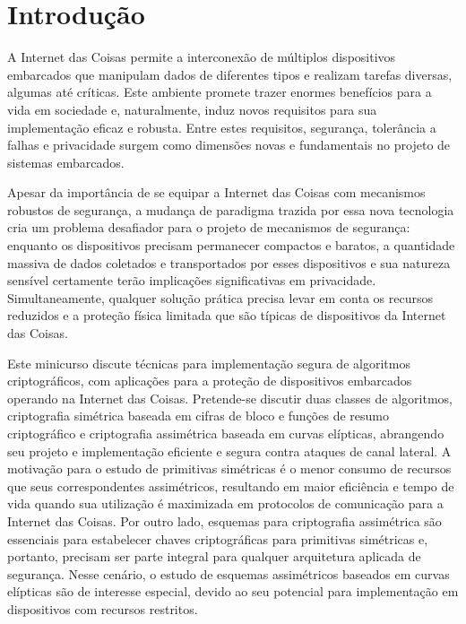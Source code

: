 \section{Introdução}

A Internet das Coisas permite a interconexão de múltiplos dispositivos embarcados que manipulam dados de diferentes tipos e realizam tarefas diversas, algumas até críticas. Este ambiente promete trazer enormes benefícios para a vida em sociedade e, naturalmente, induz novos requisitos para sua implementação eficaz e robusta. Entre estes requisitos, segurança, tolerância a falhas e privacidade surgem como dimensões novas e fundamentais no projeto de sistemas embarcados.

Apesar da importância de se equipar a Internet das Coisas com mecanismos robustos de segurança, a mudança de paradigma trazida por essa nova tecnologia cria um problema desafiador para o projeto de mecanismos de segurança: enquanto os dispositivos precisam permanecer compactos e baratos, a quantidade massiva de dados coletados e transportados por esses dispositivos e sua natureza sensível certamente terão implicações significativas em privacidade. Simultaneamente, qualquer solução prática precisa levar em conta os recursos reduzidos e a proteção física limitada que são típicas de dispositivos da Internet das Coisas.

Este minicurso discute técnicas para implementação segura de algoritmos criptográficos, com aplicações para a proteção de dispositivos embarcados operando na Internet das Coisas. Pretende-se discutir duas classes de algoritmos, criptografia simétrica baseada em cifras de bloco e funções de resumo criptográfico e criptografia assimétrica baseada em curvas elípticas, abrangendo seu projeto e implementação eficiente e segura contra ataques de canal lateral. A motivação para o estudo de primitivas simétricas é o menor consumo de recursos que seus correspondentes assimétricos, resultando em maior eficiência e tempo de vida quando sua utilização é maximizada em protocolos de comunicação para a Internet das Coisas. Por outro lado, esquemas para criptografia assimétrica são essenciais para estabelecer chaves criptográficas para primitivas simétricas e, portanto, precisam ser parte integral para qualquer arquitetura aplicada de segurança. Nesse cenário, o estudo de esquemas assimétricos baseados em curvas elípticas são de interesse especial, devido ao seu potencial para implementação em dispositivos com recursos restritos.





